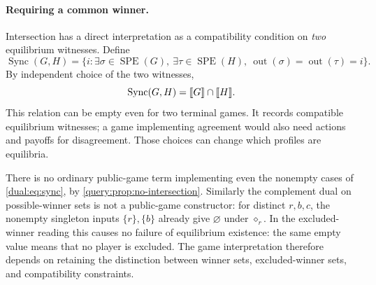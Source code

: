\paragraph{Requiring a common winner.}
Intersection has a direct interpretation as a compatibility condition on
\emph{two} equilibrium witnesses. Define
\[
 \operatorname{Sync}(G,H)=
 \{i:\exists\sigma\in\operatorname{SPE}(G),\
            \exists\tau\in\operatorname{SPE}(H),\
            \operatorname{out}(\sigma)=\operatorname{out}(\tau)=i\}.
\]
By independent choice of the two witnesses,
\begin{equation}\label{dual:eq:sync}
 \operatorname{Sync}(G,H)=\llbracket G\rrbracket\cap\llbracket H\rrbracket.
\end{equation}
This relation can be empty even for two terminal games. It records
compatible equilibrium witnesses; a game implementing agreement would
also need actions and payoffs for disagreement. Those choices can change
which profiles are equilibria.

There is no ordinary public-game term implementing even the nonempty
cases of \eqref{dual:eq:sync}, by
\cref{query:prop:no-intersection}. Similarly the complement dual on
possible-winner sets is not a public-game constructor: for distinct
$r,b,c$, the nonempty singleton inputs $\{r\},\{b\}$ already
give $\varnothing$ under $\diamond_r$. In the excluded-winner
reading this causes no failure of equilibrium existence: the same
empty value means that no player is excluded. The game interpretation
therefore depends on retaining the distinction between winner sets,
excluded-winner sets, and compatibility constraints.
